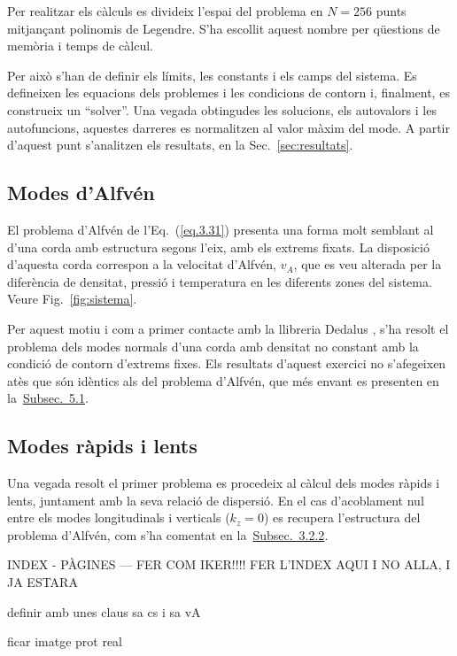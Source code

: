 \documentclass[12pt,a4paper]{article}
\numberwithin{equation}{section}
\begin{document}
Per realitzar els càlculs es divideix l'espai del problema en $N = 256$ punts mitjançant polinomis de Legendre.
S'ha escollit aquest nombre per qüestions de memòria i temps de càlcul.

Per això s'han de definir els límits, les constants i els camps del sistema.
Es defineixen les equacions dels problemes i les condicions de contorn i, finalment, es construeix un ``solver''.
Una vegada obtingudes les solucions, els autovalors i les autofuncions, aquestes darreres es normalitzen al valor màxim del mode.
A partir d'aquest punt s'analitzen els resultats, en la Sec.~\ref{sec:resultats}.


\subsection{Modes d'Alfvén} \label{subsec:mètode_Alfvén}
El problema d'Alfvén de l'Eq.~(\ref{eq.3.31}) presenta una forma molt semblant al d'una corda amb estructura segons l'eix, amb els extrems fixats.
La disposició d'aquesta corda correspon a la velocitat d'Alfvén, $v_A$, que es veu alterada per la diferència de densitat,
pressió i temperatura en les diferents zones del sistema. Veure Fig.~\ref{fig:sistema}.

Per aquest motiu i com a primer contacte amb la llibreria Dedalus \parencite{Dedalus},
s'ha resolt el problema dels modes normals d'una corda amb densitat no constant amb la condició de contorn d'extrems fixes.
Els resultats d'aquest exercici no s'afegeixen atès que són idèntics als del problema d'Alfvén,
que més envant es presenten en la~\hyperref[subsec:resultats_modes_Alfvén]{Subsec.~5.1}.


\subsection{Modes ràpids i lents} \label{subsec:mètode_r_i_l}
Una vegada resolt el primer problema es procedeix al càlcul dels modes ràpids i lents, juntament amb la seva relació de dispersió.
En el cas d'acoblament nul entre els modes longitudinals i verticals ($k_z = 0$) es recupera l'estructura del problema d'Alfvén,
com s'ha comentat en la~\hyperref[subsubsec:ones_modes_r_i_l]{Subsec.~3.2.2}.


\clearpage

INDEX - PÀGINES --- FER COM IKER!!!!
FER L'INDEX AQUI I NO ALLA, I JA ESTARA

definir amb unes claus sa cs i sa vA

ficar imatge prot real
\end{document}
